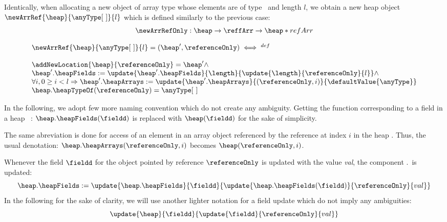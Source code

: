 Identically, when allocating a new object of array type whose elements are of type \anyType \ and length $l$, we obtain 
a new heap object  $\newArrRef{\heap}{\anyType \lbrack \ \rbrack  }{l} $ which is defined similarly to the previous case: 
$$ \newArrRefOnly :  \heap \rightarrow  \reffArr \rightarrow  \heap * refArr $$

 $$  \begin{array}{l}
            \newArrRef{\heap}{\anyType\lbrack \ \rbrack}{l} = (\heap', \referenceOnly)      \iff^{def} \\
	    \\
	    \addNewLocation{\heap}{\referenceOnly} = \heap' \wedge \\
            \heap'.\heapFields :=  \update{\heap'.\heapFields}{\length}{\update{\length}{ \referenceOnly}{ l }} \wedge  \\
	    \forall i, 0 \geq i < l  \Rightarrow   \heap'.\heapArrays :=
            \update{\heap'.\heapArrays}{(\referenceOnly , i)}{ \defaultValue{\anyType }  } \\
            \heap. \heapTypeOf(\referenceOnly ) = \anyType\lbrack \ \rbrack
                            
     \end{array} $$



In the following, we adopt few more naming convention which do not create any ambiguity.
 Getting the function corresponding to a field \fieldd in a heap \heap \ :
$ \heap . \heapFields ( \fieldd)$ is replaced  with $ \heap  ( \fieldd)$ for the sake of simplicity.
 
The same abreviation is done for access of an element in an  array object referenced by the reference 
  at index $i$ in the heap \heap. Thus, the usual denotation:
$ \heap . \heapArrays (\referenceOnly, i )$ becomes $ \heap(\referenceOnly, i )$.
 
 




 
   Whenever the  field $\fieldd$ for the object pointed by reference
 $\referenceOnly$ is updated  with the value \textit{val},
 the component \heap.\heapFields \ is updated:
 $$ \heap.\heapFields := \update{\heap.\heapFields}{\fieldd}{\update{\heap.\heapFields(\fieldd)}{\referenceOnly}{val}} $$  
 In the following for the sake of clarity, we will use another lighter notation for a field update which do not imply any ambiguities:
 $$ 
  \update{\heap}{\fieldd}{\update{\fieldd}{\referenceOnly}{val}} 
 $$ 



